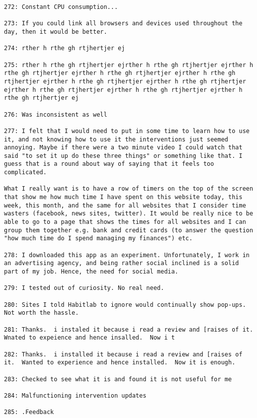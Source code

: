 \begin{lstlisting}[breaklines]
272: Constant CPU consumption...

273: If you could link all browsers and devices used throughout the day, then it would be better.

274: rther h rthe gh rtjhertjer ej

275: rther h rthe gh rtjhertjer ejrther h rthe gh rtjhertjer ejrther h rthe gh rtjhertjer ejrther h rthe gh rtjhertjer ejrther h rthe gh rtjhertjer ejrther h rthe gh rtjhertjer ejrther h rthe gh rtjhertjer ejrther h rthe gh rtjhertjer ejrther h rthe gh rtjhertjer ejrther h rthe gh rtjhertjer ej

276: Was inconsistent as well

277: I felt that I would need to put in some time to learn how to use it, and not knowing how to use it the interventions just seemed annoying. Maybe if there were a two minute video I could watch that said "to set it up do these three things" or something like that. I guess that is a round about way of saying that it feels too complicated.

What I really want is to have a row of timers on the top of the screen that show me how much time I have spent on this website today, this week, this month, and the same for all websites that I consider time wasters (facebook, news sites, twitter). It would be really nice to be able to go to a page that shows the times for all websites and I can group them together e.g. bank and credit cards (to answer the question "how much time do I spend managing my finances") etc.

278: I downloaded this app as an experiment. Unfortunately, I work in an advertising agency, and being rather social inclined is a solid part of my job. Hence, the need for social media.

279: I tested out of curiosity. No real need.

280: Sites I told Habitlab to ignore would continually show pop-ups. Not worth the hassle.

281: Thanks.  i instaled it because i read a review and [raises of it.  Wnated to expeience and hence insalled.  Now i t

282: Thanks.  i installed it because i read a review and [raises of it.  Wanted to experience and hence installed.  Now it is enough.

283: Checked to see what it is and found it is not useful for me

284: Malfunctioning intervention updates

285: .Feedback


\end{lstlisting}
